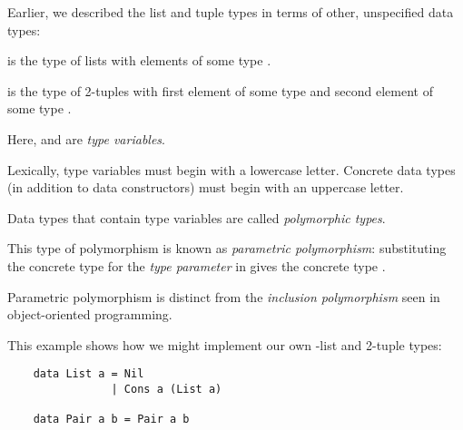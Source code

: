 \begin{notelist}
    \item Earlier, we described the list and tuple types in terms of other, unspecified data types:
    \begin{notelist}
        \item \code{[a]} is the type of lists with elements of some type .
        \item {} is the type of 2-tuples with first element of some type  and second 
              element of some type .
    \end{notelist}
    \item Here,  and  are \textit{type variables}.
    \item Lexically, type variables must begin with a lowercase letter. Concrete data types (in addition to
          data constructors) must begin with an uppercase letter.
    \item Data types that contain type variables are called \textit{polymorphic types}. 
    \item This type of polymorphism is known as \textit{parametric polymorphism}: substituting the concrete
          type  for the \textit{type parameter}  in \code{[a]} gives the concrete type
          \code{[Char]}.
    \item Parametric polymorphism is distinct from the \textit{inclusion polymorphism} seen in object-oriented
          programming.
    \item This example shows how we might implement our own -list and 2-tuple types:
    \begin{lstlisting}
    data List a = Nil
                | Cons a (List a) 

    data Pair a b = Pair a b


\end{lstlisting}
\end{notelist}
